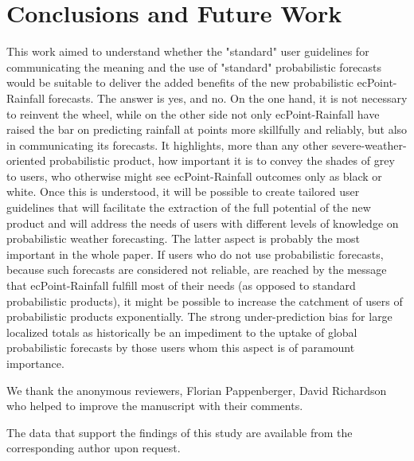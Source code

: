 \documentclass[twocol]{ametsocV5} %
\begin{document}
\section{Conclusions and Future Work}
This work aimed to understand whether the "standard" user guidelines for communicating the meaning and the use of "standard" probabilistic forecasts would be suitable to deliver the added benefits of the new probabilistic ecPoint-Rainfall forecasts. The answer is yes, and no. On the one hand, it is not necessary to reinvent the wheel, while on the other side not only ecPoint-Rainfall have raised the bar on predicting rainfall at points more skillfully and reliably, but also in communicating its forecasts. It highlights, more than any other severe-weather-oriented probabilistic product, how important it is to convey the shades of grey to users, who otherwise might see ecPoint-Rainfall outcomes only as black or white. Once this is understood, it will be possible to create tailored user guidelines that will facilitate the extraction of the full potential of the new product and will address the needs of users with different levels of knowledge on probabilistic weather forecasting. The latter aspect is probably the most important in the whole paper. If users who do not use probabilistic forecasts, because such forecasts are considered not reliable, are reached by the message that ecPoint-Rainfall fulfill most of their needs (as opposed to standard probabilistic products), it might be possible to increase the catchment of users of probabilistic products exponentially.
The strong under-prediction bias for large localized totals as historically be an impediment to the uptake of global probabilistic forecasts by those users whom this aspect is of paramount importance.


\acknowledgments
We thank the anonymous reviewers, Florian Pappenberger, David Richardson who helped to improve the manuscript with their comments.


\datastatement
The data that support the findings of this study are available from the corresponding author upon request.




\end{document}
